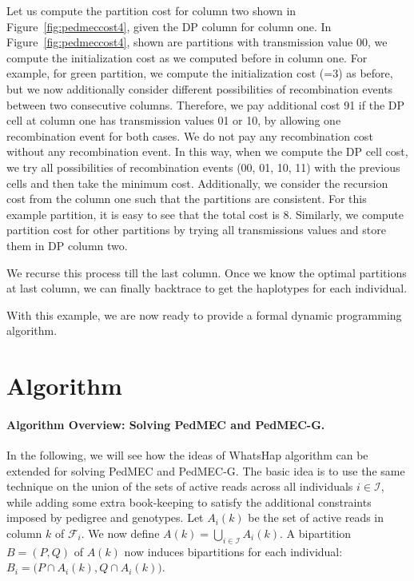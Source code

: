Let us compute the partition cost for column two shown in Figure~\ref{fig:pedmeccost4}, given the DP column for column one.
In Figure~\ref{fig:pedmeccost4}, shown are partitions with transmission value 00, we compute the initialization cost as we computed before in column one. 
For example, for green partition, we compute the initialization cost (=3) as before, but we now additionally consider different possibilities of recombination events between two consecutive columns.
Therefore, we pay additional cost 91 if the DP cell at column one has transmission values 01 or 10, by allowing one recombination event for both cases. We do not pay any recombination cost without any recombination event.
In this way, when we compute the DP cell cost, we try all possibilities of recombination events (00, 01, 10, 11) with the previous cells and then take the minimum cost. 
Additionally, we consider the recursion cost from the column one such that the partitions are consistent.
For this example partition, it is easy to see that the total cost is 8.
Similarly, we compute partition cost for other partitions by trying all transmissions values and store them in DP column two.

We recurse this process till the last column. Once we know the optimal partitions at last column, we can finally backtrace to get the haplotypes for each individual.

With this example, we are now ready to provide a formal dynamic programming algorithm.

\section{Algorithm}\label{sec:algorithm}
\paragraph{Algorithm Overview: Solving PedMEC and PedMEC-G.}
In the following, we will see how the ideas of WhatsHap algorithm can be extended for solving PedMEC and PedMEC-G.
The basic idea is to use the same technique on the union of the sets of active reads across all individuals $i\in\mathcal{I}$, while adding some extra book-keeping to satisfy the additional constraints imposed by pedigree and genotypes.
Let $A_i(k)$ be the set of active reads in column $k$ of $\mathcal{F}_i$.
We now define $A(k)=\bigcup_{i\in\mathcal{I}}A_i(k)$.
A bipartition $B=(P,Q)$ of $A(k)$ now induces bipartitions for each individual: $B_i=\big(P\cap A_i(k), Q\cap A_i(k)\big)$.

